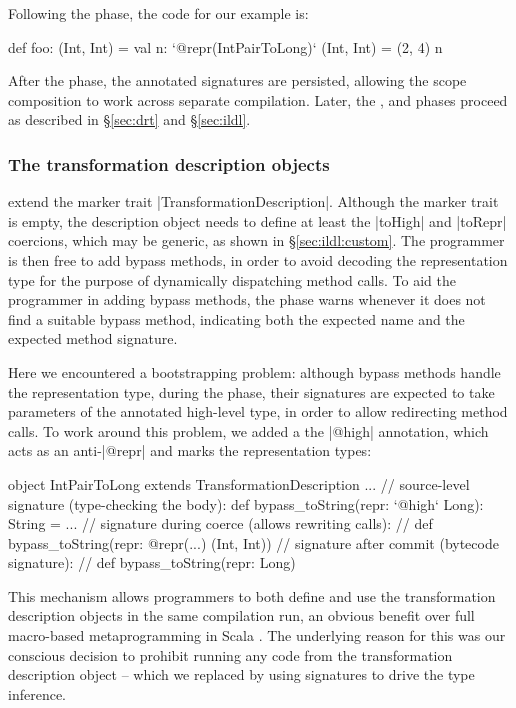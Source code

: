\noindent Following the \inject{} phase, the code for our example is:

\begin{lstlisting-nobreak}
def foo: (Int, Int) = {
  val n: `@repr(IntPairToLong)` (Int, Int) = (2, 4)
  n
}
\end{lstlisting-nobreak}

\noindent
After the \inject{} phase, the annotated signatures are persisted, allowing the scope composition to work across separate compilation.
Later, the \bridge{}, \coerce{} and \commit{} phases proceed as described in \S\ref{sec:drt} and \S\ref{sec:ildl}.

\subsubsection{The transformation description objects} extend the marker trait |TransformationDescription|. Although the marker trait is empty, the description object needs to define at least the |toHigh| and |toRepr| coercions, which may be generic, as shown in \S\ref{sec:ildl:custom}. The programmer is then free to add bypass methods, in order to avoid decoding the representation type for the purpose of dynamically dispatching method calls. To aid the programmer in adding bypass methods, the \coerce{} phase warns whenever it does not find a suitable bypass method, indicating both the expected name and the expected method signature. 

Here we encountered a bootstrapping problem: although bypass methods handle the representation type, during the \coerce{} phase, their signatures are expected to take parameters of the annotated high-level type, in order to allow redirecting method calls. To work around this problem, we added a the |@high| annotation, which acts as an anti-|@repr| and marks the representation types:

\begin{lstlisting-nobreak}
object IntPairToLong extends TransformationDescription{
  ...
  // source-level signature (type-checking the body):
  def bypass_toString(repr: `@high` Long): String = ...
  // signature during coerce (allows rewriting calls):
  //   def bypass_toString(repr: @repr(...) (Int, Int))
  // signature after commit (bytecode signature):
  //   def bypass_toString(repr: Long)
}
\end{lstlisting-nobreak}

This mechanism allows programmers to both define and use the transformation description objects in the same compilation run, an obvious benefit over full macro-based metaprogramming in Scala \cite{eugene-macros}. The underlying reason for this was our conscious decision to prohibit running any code from the transformation description object -- which we replaced by using signatures to drive the type inference.

